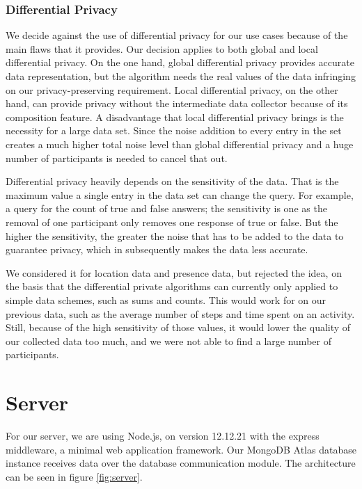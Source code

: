 \subsubsection{Differential Privacy}
We decide against the use of differential privacy for our use cases because of the main flaws that it provides. Our decision applies to both global and local differential privacy. On the one hand, global differential privacy provides accurate data representation, but the algorithm needs the real values of the data infringing on our privacy-preserving requirement. Local differential privacy, on the other hand, can provide privacy without the intermediate data collector because of its composition feature. A disadvantage that local differential privacy brings is the necessity for a large data set. Since the noise addition to every entry in the set creates a much higher total noise level than global differential privacy and a huge number of participants is needed to cancel that out. 

Differential privacy heavily depends on the sensitivity of the data. That is the maximum value a single entry in the data set can change the query. For example, a query for the count of true and false answers; the sensitivity is one as the removal of one participant only removes one response of true or false. But the higher the sensitivity, the greater the noise that has to be added to the data to guarantee privacy, which in subsequently makes the data less accurate.

We considered it for location data and presence data, but rejected the idea, on the basis that the differential private algorithms can currently only applied to simple data schemes, such as sums and counts. This would work for on our previous data, such as the average number of steps and time spent on an activity. Still, because of the high sensitivity of those values, it would lower the quality of our collected data too much, and we were not able to find a large number of participants.

\section{Server}
For our server, we are using Node.js,
on version 12.12.21 with the express middleware, a minimal web application framework.
Our MongoDB Atlas database instance
receives data over the database communication module. The architecture can be seen in figure \ref{fig:server}.

